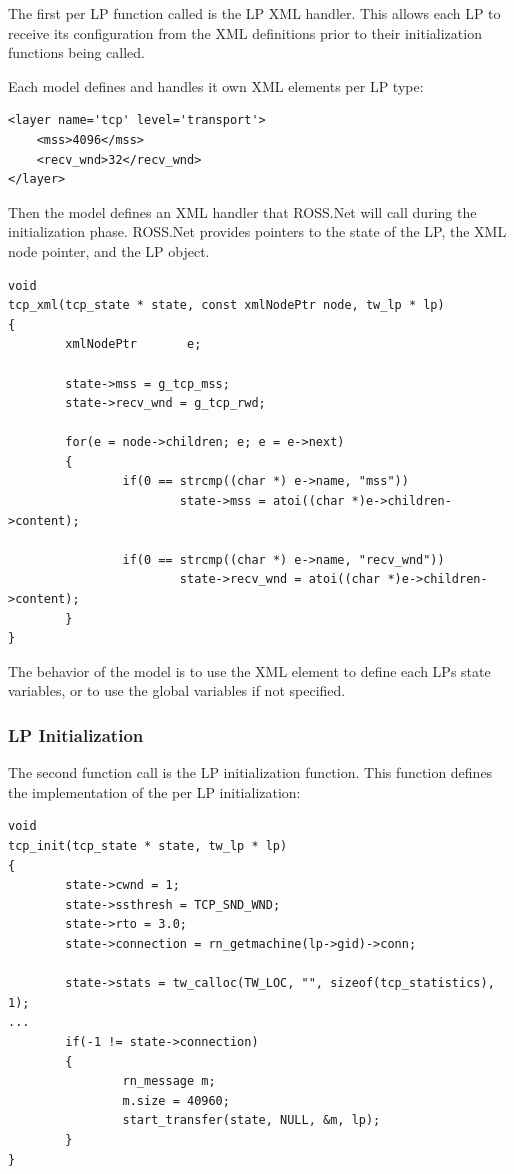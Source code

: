 \documentclass[conference,onecolumn]{IEEEtran}
\begin{document}
The first per LP function called is the LP XML handler.  This allows each LP to receive its configuration from the XML definitions prior to their initialization functions being called.

Each model defines and handles it own XML elements per LP type:

\begin{small}\begin{verbatim}
<layer name='tcp' level='transport'>
    <mss>4096</mss>
    <recv_wnd>32</recv_wnd>
</layer>
\end{verbatim}\end{small}

Then the model defines an XML handler that ROSS.Net will call during the initialization phase.  ROSS.Net provides pointers to the state of the LP, the XML node pointer, and the LP object.

\begin{small}\begin{verbatim}
void
tcp_xml(tcp_state * state, const xmlNodePtr node, tw_lp * lp)
{
        xmlNodePtr       e;

        state->mss = g_tcp_mss;
        state->recv_wnd = g_tcp_rwd;
        
        for(e = node->children; e; e = e->next)
        {
                if(0 == strcmp((char *) e->name, "mss"))
                        state->mss = atoi((char *)e->children->content);

                if(0 == strcmp((char *) e->name, "recv_wnd"))
                        state->recv_wnd = atoi((char *)e->children->content);
        }
}
\end{verbatim}\end{small}

The behavior of the model is to use the XML element to define each LPs state variables, or to use the global variables if not specified.
                                                
\subsubsection{LP Initialization}

The second function call is the LP initialization function.  This function defines the implementation of the per LP initialization:

\begin{small}\begin{verbatim}
void
tcp_init(tcp_state * state, tw_lp * lp)
{
        state->cwnd = 1;
        state->ssthresh = TCP_SND_WND;
        state->rto = 3.0;
        state->connection = rn_getmachine(lp->gid)->conn;

        state->stats = tw_calloc(TW_LOC, "", sizeof(tcp_statistics), 1);
...
        if(-1 != state->connection)
        {
                rn_message m;
                m.size = 40960;
                start_transfer(state, NULL, &m, lp);
        }
}
\end{verbatim}\end{small}
\end{document}

